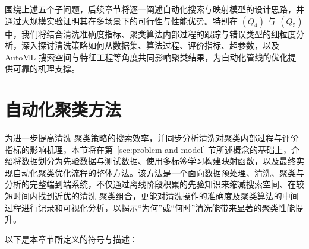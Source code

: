 \documentclass[10pt]{article} %
\numberwithin{equation}{section}
\begin{document}
围绕上述五个子问题，后续章节将逐一阐述自动化搜索与映射模型的设计思路，并通过大规模实验证明其在多场景下的可行性与性能优势。特别在 \((Q_4)\) 与 \((Q_5)\) 中，我们将结合清洗准确度指标、聚类算法内部过程的跟踪与错误类型的细粒度分析，深入探讨清洗策略如何从数据集、算法过程、评价指标、超参数，以及 AutoML 搜索空间与特征工程等角度共同影响聚类结果，为自动化管线的优化提供可靠的机理支撑。


\section{自动化聚类方法}
\label{sec:autoML}

为进一步提高清洗-聚类策略的搜索效率，并同步分析清洗对聚类内部过程与评价指标的影响机理，本节将在第~\ref{sec:problem-and-model} 节所述概念的基础上，介绍将数据划分为先验数据与测试数据、使用多标签学习构建映射函数，以及最终实现自动化聚类优化流程的整体方法。该方法是一个面向数据预处理、清洗、聚类与分析的完整端到端系统，不仅通过离线阶段积累的先验知识来缩减搜索空间、在较短时间内找到近优的清洗-聚类组合，更能对清洗操作的准确度及聚类算法的中间过程进行记录和可视化分析，以揭示“为何”或“何时”清洗能带来显著的聚类性能提升。

以下是本章节所定义的符号与描述：
\end{document}
